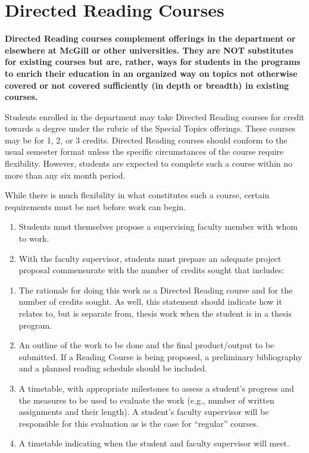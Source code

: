 \documentclass[
]{book}
\begin{document}
\hypertarget{directed-reading-courses}{%
\section{Directed Reading Courses}\label{directed-reading-courses}}

\textbf{Directed Reading courses complement offerings in the department or elsewhere at McGill or other universities. They are NOT substitutes for existing courses but are, rather, ways for students in the programs to enrich their education in an organized way on topics not otherwise covered or not covered sufficiently (in depth or breadth) in existing courses.}

Students enrolled in the department may take Directed Reading courses for credit towards a degree under the rubric of the Special Topics offerings. These courses may be for 1, 2, or 3 credits. Directed Reading courses should conform to the usual semester format unless the specific circumstances of the course require flexibility. However, students are expected to complete such a course within no more than any six month period.

While there is much flexibility in what constitutes such a course, certain requirements must be met before work can begin.

\begin{enumerate}
\def\labelenumi{\arabic{enumi}.}
\item
  Students must themselves propose a supervising faculty member with whom to work.
\item
  With the faculty supervisor, students must prepare an adequate project proposal commensurate with the number of credits sought that includes:
\end{enumerate}

\begin{enumerate}
\def\labelenumi{\alph{enumi}.}
\item
  The rationale for doing this work as a Directed Reading course and for the number of credits sought. As well, this statement should indicate how it relates to, but is separate from, thesis work when the student is in a thesis program.
\item
  An outline of the work to be done and the final product/output to be submitted. If a Reading Course is being proposed, a preliminary bibliography and a planned reading schedule should be included.
\item
  A timetable, with appropriate milestones to assess a student's progress and the measures to be used to evaluate the work (e.g., number of written assignments and their length). A student's faculty supervisor will be responsible for this evaluation as is the case for ``regular'' courses.
\item
  A timetable indicating when the student and faculty supervisor will meet.
\end{enumerate}
\end{document}
